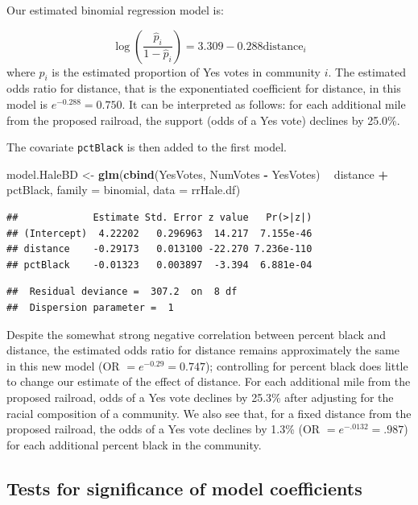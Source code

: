 \documentclass[
]{krantz}
\newenvironment{Shaded}{\begin{snugshade}}{\end{snugshade}}
\newcommand{\DataTypeTok}[1]{\textcolor[rgb]{0.27,0.27,0.27}{#1}}
\newcommand{\KeywordTok}[1]{\textcolor[rgb]{0.27,0.27,0.27}{\textbf{#1}}}
\newcommand{\NormalTok}[1]{#1}
\newcommand{\OperatorTok}[1]{\textcolor[rgb]{0.43,0.43,0.43}{\textbf{#1}}}
\newcommand{\StringTok}[1]{\textcolor[rgb]{0.5,0.5,0.5}{#1}}
\begin{document}
Our estimated binomial regression model is:

\[\log\left(\frac{\hat{p}_i}{1-\hat{p}_i}\right)=3.309-0.288 \textrm{distance}_i\]
where \(\hat{p}_i\) is the estimated proportion of Yes votes in community \(i\). The estimated odds ratio for distance, that is the exponentiated coefficient for distance, in this model is \(e^{-0.288}=0.750\). It can be interpreted as follows: for each additional mile from the proposed railroad, the support (odds of a Yes vote) declines by 25.0\%.

The covariate \texttt{pctBlack} is then added to the first model.

\begin{Shaded}
\begin{Highlighting}[]
\NormalTok{model.HaleBD <-}\StringTok{ }\KeywordTok{glm}\NormalTok{(}\KeywordTok{cbind}\NormalTok{(YesVotes, NumVotes }\OperatorTok{-}\StringTok{ }\NormalTok{YesVotes) }\OperatorTok{~}
\StringTok{  }\NormalTok{distance }\OperatorTok{+}\StringTok{ }\NormalTok{pctBlack, }\DataTypeTok{family =}\NormalTok{ binomial, }\DataTypeTok{data =}\NormalTok{ rrHale.df)}
\end{Highlighting}
\end{Shaded}

\begin{verbatim}
##             Estimate Std. Error z value   Pr(>|z|)
## (Intercept)  4.22202   0.296963  14.217  7.155e-46
## distance    -0.29173   0.013100 -22.270 7.236e-110
## pctBlack    -0.01323   0.003897  -3.394  6.881e-04
\end{verbatim}

\begin{verbatim}
##  Residual deviance =  307.2  on  8 df 
##  Dispersion parameter =  1
\end{verbatim}

Despite the somewhat strong negative correlation between percent black and distance, the estimated odds ratio for distance remains approximately the same in this new model (OR \(= e^{-0.29} = 0.747\)); controlling for percent black does little to change our estimate of the effect of distance. For each additional mile from the proposed railroad, odds of a Yes vote declines by 25.3\% after adjusting for the racial composition of a community. We also see that, for a fixed distance from the proposed railroad, the odds of a Yes vote declines by 1.3\% (OR \(= e^{-.0132} = .987\)) for each additional percent black in the community.

\hypertarget{sec-logisticInf}{%
\subsection{Tests for significance of model coefficients}\label{sec-logisticInf}}
\end{document}
